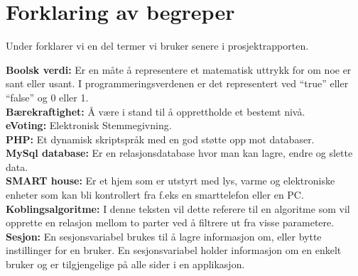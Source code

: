 \section*{Forklaring av begreper}

Under forklarer vi en del termer vi bruker senere i prosjektrapporten.

{\bf Boolsk verdi:} Er en måte å representere et matematisk uttrykk for om noe er sant eller usant. I programmeringsverdenen er det representert ved ``true'' eller ``false'' og 0 eller 1.\citep{website:wiki_boolean}\\

{\bf Bærekraftighet:} Å være i stand til å opprettholde et bestemt nivå.\citep{website:sustainable}\\

{\bf eVoting:} Elektronisk Stemmegivning. \citep{website:wiki_evoting}\\

{\bf PHP:} Et dynamisk skriptspråk med en god støtte opp mot databaser.\citep{website:wiki_PHP}\\

{\bf MySql database:} Er en relasjonsdatabase hvor man kan lagre, endre og slette data. \citep{website:glossary}\\

{\bf SMART house:} Er et hjem som er utstyrt med lys, varme og elektroniske enheter som kan bli kontrollert fra f.eks en smarttelefon eller en PC. \citep{website:smarthome}\\

{\bf Koblingsalgoritme:}  I denne teksten vil dette referere til en algoritme som vil opprette en relasjon mellom to parter ved å filtrere ut fra visse parametere.\\

{\bf Sesjon:} En sesjonsvariabel brukes til å lagre informasjon om, eller bytte instillinger for en bruker. En sesjonsvariabel holder informasjon om en enkelt bruker og er tilgjengelige på alle sider i en applikasjon.\citep{website:sessionvariable}
